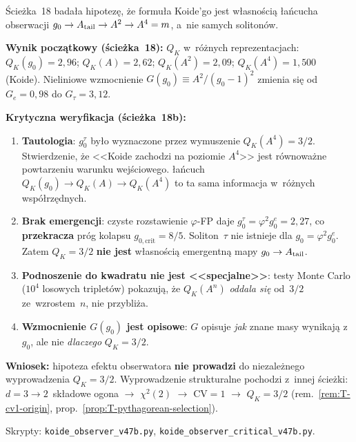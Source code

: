 \begin{remark}%
\label{rem:T-observer-effect}
\'Scie\.zka~18 bada\l{}a hipotez\k{e}, \.ze formu\l{}a Koide'go jest
w\l{}asno\'sci\k{a} \l{}a\'ncucha obserwacji
$g_0 \to A_{\rm tail} \to A^2 \to A^4 = m$,
a~nie samych soliton\'ow.

\medskip\noindent
\textbf{Wynik pocz\k{a}tkowy (\'scie\.zka~18):}
$Q_K$ w~r\'o\.znych reprezentacjach:
$Q_K(g_0) = 2{,}96$;
$Q_K(A) = 2{,}62$;
$Q_K(A^2) = 2{,}09$;
$Q_K(A^4) = 1{,}500$ (Koide).
Nieliniowe wzmocnienie $G(g_0) \equiv A^2/(g_0{-}1)^2$
zmienia si\k{e} od $G_e = 0{,}98$ do $G_\tau = 3{,}12$.

\medskip\noindent
\textbf{Krytyczna weryfikacja (\'scie\.zka~18b):}
\begin{enumerate}[nosep]
  \item \textbf{Tautologia}: $g_0^\tau$ by\l{}o wyznaczone
    przez wymuszenie $Q_K(A^4) = 3/2$.
    Stwierdzenie, \.ze <<Koide zachodzi na poziomie $A^4$>>
    jest r\'ownowa\.zne powtarzeniu warunku wej\'sciowego.
    \l{}a\'ncuch $Q_K(g_0) \to Q_K(A) \to Q_K(A^4)$ to ta sama
    informacja w~r\'o\.znych wsp\'o\l{}rz\k{e}dnych.
  \item \textbf{Brak emergencji}: czyste rozstawienie $\varphi$-FP
    daje $g_0^\tau = \varphi^2 g_0^e = 2{,}27$, co \textbf{przekracza}
    pr\'og kolapsu $g_{0,\mathrm{crit}} = 8/5$.
    Soliton~$\tau$ nie istnieje dla $g_0 = \varphi^2 g_0^e$.
    Zatem $Q_K = 3/2$ \textbf{nie jest} w\l{}asno\'sci\k{a}
    emergent\-n\k{a} mapy $g_0 \to A_{\rm tail}$.
  \item \textbf{Podnoszenie do kwadratu nie jest <<specjalne>>}:
    testy Monte Carlo ($10^4$ losowych triplet\'ow)
    pokazuj\k{a}, \.ze $Q_K(A^n)$ \emph{oddala si\k{e}} od~$3/2$
    ze~wzrostem~$n$, nie przybli\.za.
  \item \textbf{Wzmocnienie $G(g_0)$ jest opisowe}:
    $G$ opisuje \emph{jak} znane masy wynikaj\k{a} z~$g_0$,
    ale nie \emph{dlaczego} $Q_K = 3/2$.
\end{enumerate}

\medskip\noindent
\textbf{Wniosek:} hipoteza efektu obserwatora \textbf{nie prowadzi}
do niezale\.znego wyprowadzenia $Q_K = 3/2$.
Wyprowadzenie strukturalne pochodzi z~innej \'scie\.zki:
$d = 3 \to 2$~sk\l{}adowe ogona $\to$ $\chi^2(2)$ $\to$
$\mathrm{CV} = 1$ $\to$ $Q_K = 3/2$
(rem.~\ref{rem:T-cv1-origin},
prop.~\ref{prop:T-pythagorean-selection}).

Skrypty: \texttt{koide\_observer\_v47b.py},
\texttt{koide\_observer\_critical\_v47b.py}.
\end{remark}

